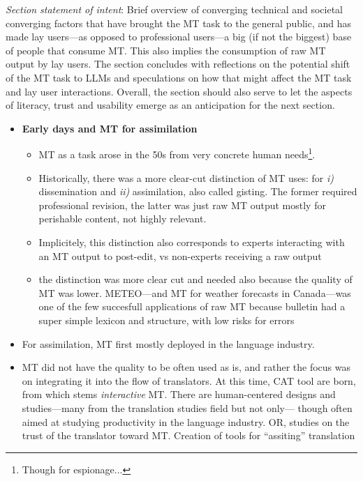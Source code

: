 
\textit{Section statement of intent}: Brief overview of converging technical and societal converging factors that have brought the MT task to the general public, and has made lay users---as opposed to professional users---a big (if not the biggest) base of people that consume MT. This also implies the consumption of raw MT output by lay users. The section concludes with reflections on the potential shift of the MT task to LLMs and speculations on how that might affect the MT task and lay user interactions. Overall, the section should also serve to let the aspects of literacy, trust and usability emerge as an anticipation for the next section.   

\begin{itemize}

\item \textbf{Early days and MT for assimilation}

\begin{itemize}

\item MT as a task arose in the 50s from very concrete human needs\footnote{Though for espionage...}. 
\item Historically, there was a more clear-cut distinction of MT uses: for \textit{i)} dissemination and \textit{ii)} assimilation, also called gisting. The former required professional revision, the latter was just raw MT output mostly for perishable content, not highly relevant.
\end{itemize}
\begin{itemize}
    \begin{itemize}
        \item Implicitely, this distinction also corresponds to experts interacting with an MT output to post-edit, vs non-experts receiving a raw output
        \item the distinction was more clear cut and needed also because the quality of MT was lower. METEO---and MT for weather forecasts in Canada---was one of the few succesfull applications of raw MT because bulletin had a super simple lexicon and structure, with low risks for errors
    \end{itemize}
\end{itemize}
\item For assimilation, MT first mostly deployed in the language industry.  
\item MT did not have the quality to be often used as is, and rather the focus was on integrating it into the flow of translators. At this time, CAT tool are born, from which stems \textit{interactive} MT. There are human-centered designs and studies---many from the translation studies field but not only--- though often aimed at studying productivity in the language industry. OR, studies on the trust of the translator toward MT.  Creation of tools for ``assiting'' translation

\end{itemize}

